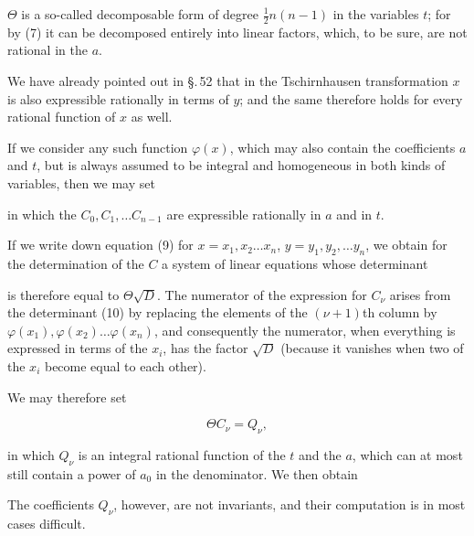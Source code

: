
$\Theta$ is a so-called decomposable form of degree $\frac{1}{2}n(n-1)$ in the variables $t$; for by (7) it can be decomposed entirely into linear factors, which, to be sure, are not rational in the $a$.

We have already pointed out in \S.\,52 that in the Tschirnhausen transformation $x$ is also expressible rationally in terms of $y$; and the same therefore holds for every rational function of $x$ as well.

If we consider any such function $\varphi(x)$, which may also contain the coefficients $a$ and $t$, but is always assumed to be integral and homogeneous in both kinds of variables, then we may set


in which the $C_0, C_1, \ldots C_{n-1}$ are expressible rationally in $a$ and in $t$.

If we write down equation (9) for $x=x_1,x_2\ldots x_n$, $y=y_1,y_2,\ldots y_n$, we obtain for the determination of the $C$ a system of linear equations whose determinant


is therefore equal to $\Theta\sqrt{D}$. The numerator of the expression for $C_\nu$ arises from the determinant (10) by replacing the elements of the $(\nu+1)$th column by $\varphi(x_1), \varphi(x_2)\ldots\varphi(x_n)$, and consequently the numerator, when everything is expressed in terms of the $x_i$, has the factor $\sqrt{D}$ (because it vanishes when two of the $x_i$ become equal to each other).

We may therefore set

\[ \Theta C_\nu = Q_\nu, \]

in which $Q_\nu$ is an integral rational function of the $t$ and the $a$, which can at most still contain a power of $a_0$ in the denominator. We then obtain


The coefficients $Q_\nu$, however, are not invariants, and their computation is in most cases difficult.
